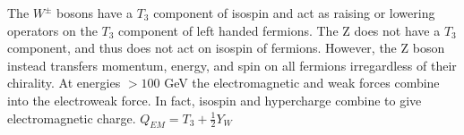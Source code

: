		The $W^\pm$ bosons have a $T_3$ component of isospin and act as raising or lowering operators on the $T_3$ component of left handed fermions. The Z does not have a $T_3$ component, and thus does not act on isospin of fermions. However, the Z boson instead transfers momentum, energy, and spin on all fermions irregardless of their chirality. At energies $> 100 $ GeV the electromagnetic and weak forces combine into the electroweak force. In fact, isospin and hypercharge combine to give electromagnetic charge. $Q_{EM} = T_3 + \frac{1}{2} Y_W$

